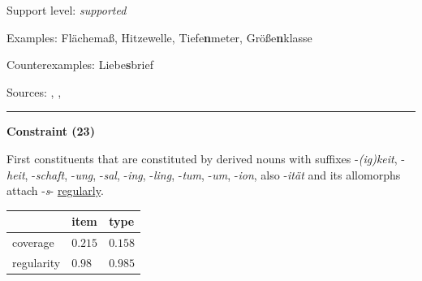 \noindent
Support level: \textit{supported}

\vspace{0.3em}

\noindent
Examples: Fläche{\zeroLinker}maß, Hitze{\zeroLinker}welle, Tiefe\textbf{n}meter, Größe\textbf{n}klasse

\noindent
Counterexamples: Liebe\textbf{s}brief

\vspace{0.3em}

\noindent
Sources: \citet[573]{fuhrhop_kuerschner_2015}, \citet[112]{kuerschner_2005}, \citet[93]{ortner_mueller-bollhagen_1991}


\hrule




\vspace{0.4em}

\begin{center}
\textbf{Constraint (23)}
\end{center}

\noindent
First constituents that are constituted by derived nouns with suffixes -\textit{(ig)keit}, -\textit{heit}, -\textit{schaft}, -\textit{ung}, -\textit{sal}, -\textit{ing}, -\textit{ling}, -\textit{tum}, -\textit{um}, -\textit{ion}, also -\textit{ität} and its allomorphs attach -\textit{s}- \underline{regularly}.
\vspace{0.35em}


\vspace{-0.35em}

\begin{table}[!ht]
\begin{center}

\begin{tabularx}{\columnwidth}{|X|X|X|}
\hline
 & item & type \\
\hline
 coverage & $0.215$ & $0.158$ \\
\hline
 regularity & $0.98$ & $0.985$ \\
\hline
\end{tabularx}
\end{center}
\end{table}


